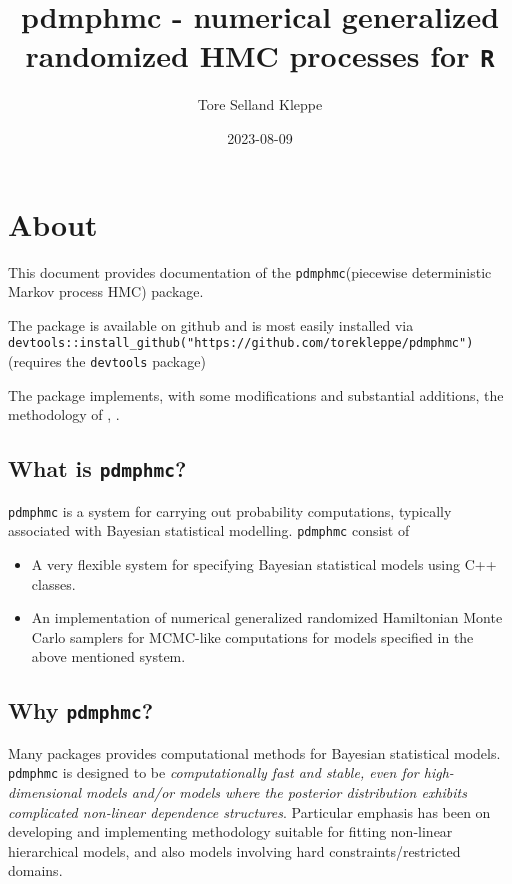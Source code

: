 \documentclass[
]{book}
\title{pdmphmc - numerical generalized randomized HMC processes for \texttt{R}}
\author{Tore Selland Kleppe}
\date{2023-08-09}
\begin{document}
\maketitle

{
\setcounter{tocdepth}{1}
\tableofcontents
}
\hypertarget{about}{%
\chapter{About}\label{about}}

This document provides documentation of the \texttt{pdmphmc}(piecewise deterministic Markov process HMC) package.

The package is available on github and is most easily installed via \texttt{devtools::install\_github("https://github.com/torekleppe/pdmphmc")} (requires the \texttt{devtools} package)

The package implements, with some modifications and substantial additions, the methodology of \citet{kleppe_CTHMC}, \citet{kleppe_amt}.

\hypertarget{what-is-pdmphmc}{%
\section{\texorpdfstring{What is \texttt{pdmphmc}?}{What is pdmphmc?}}\label{what-is-pdmphmc}}

\texttt{pdmphmc} is a system for carrying out probability computations, typically associated with Bayesian statistical modelling. \texttt{pdmphmc} consist of

\begin{itemize}
\item
  A very flexible system for specifying Bayesian statistical models using C++ classes.
\item
  An implementation of numerical generalized randomized Hamiltonian Monte Carlo samplers for MCMC-like computations for models specified in the above mentioned system.
\end{itemize}

\hypertarget{why-pdmphmc}{%
\section{\texorpdfstring{Why \texttt{pdmphmc}?}{Why pdmphmc?}}\label{why-pdmphmc}}

Many packages provides computational methods for Bayesian statistical models. \texttt{pdmphmc} is designed to be \emph{computationally fast and stable, even for high-dimensional models and/or models where the posterior distribution exhibits complicated non-linear dependence structures}. Particular emphasis has been on developing and implementing methodology suitable for fitting non-linear hierarchical models, and also models involving hard constraints/restricted domains.
\end{document}
